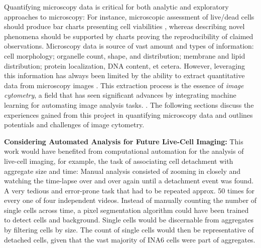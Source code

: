 %
\label{sec:discussion_potential_microscopy}%
Quantifying microscopy data is critical for both analytic and exploratory
approaches to microscopy: For instance, microscopic assessment of live/dead
cells should produce bar charts presenting cell viabilities
\cite{spaepenDigitalImageProcessing2011}, whereas describing novel phenomena
should be supported by charts proving the reproducibility of claimed
observations. Microscopy data is source of vast amount and types of information:
cell morphology; organelle count, shape, and distribution; membrane and lipid
distribution; protein localization, DNA content, et cetera. However, leveraging
this information has always been limited by the ability to extract quantitative
data from microscopy images \cite{galbraithPumpingVolume2023}. This extraction
process is the essence of \emph{image cytometry}, a field that has seen significant
advances by integrating machine learning for automating image analysis tasks.
\cite{guptaDeepLearningImage2019}. The following sections discuss the
experiences gained from this project in quantifying microscopy data and outlines
potentials and challenges of image cytometry.





\textbf{Considering Automated Analysis for Future Live-Cell Imaging:}
This work would have benefited from computational automation for the analysis of
live-cell imaging, for example, the task of associating \INA cell detachment
with \INA aggregate size and time: Manual analysis consisted of zooming in
closely and watching the time-lapse over and over again until a detachment event
was found. A very tedious and error-prone task that had to be repeated approx.
50 times for every one of four independent videos. Instead of manually counting
the number of single \INA cells across time, a pixel segmentation algorithm
could have been trained to detect cells and background. Single cells would be
discernable from aggregates by filtering cells by size. The count of single
cells would then be representative of detached cells, given that the vast
majority of INA6 cells were part of aggregates.



